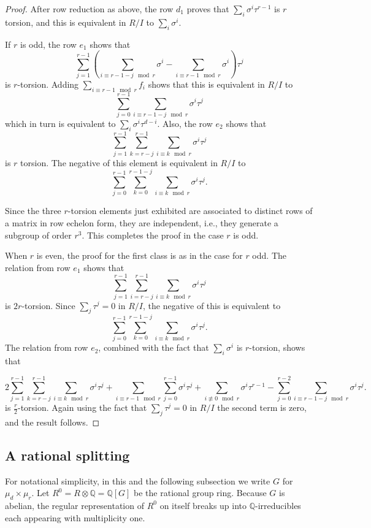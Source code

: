 \documentclass[reqno]{amsart}
\theoremstyle{definition}
\theoremstyle{remark}
\def\Q{\mathbb{Q}}
\def\tensor{\otimes}
\begin{document}
\begin{proof}
After row reduction as above, the row $d_1$ proves that
$\sum_i\sigma^i\tau^{r-1}$ is $r$ torsion, and this is equivalent in
$R/I$ to $\sum_i\sigma^i$.

If $r$ is odd, the row $e_1$ shows that 
$$\sum_{j=1}^{r-1}\left(\sum_{i\equiv r-1-j\mod r}\sigma^i-
\sum_{i\equiv r-1\mod r}\sigma^i\right)\tau^j$$
is $r$-torsion.  Adding $\sum_{i\equiv r-1\mod r}f_i$ shows that this
is equivalent in $R/I$ to
$$\sum_{j=0}^{r-1}\sum_{i\equiv r-1-j\mod r}\sigma^i\tau^j$$
which in turn is equivalent to $\sum_i\sigma^i\tau^{d-i}$.
Also, the row $e_2$ shows that
$$\sum_{j=1}^{r-1}\sum_{k=r-j}^{r-1}\sum_{i\equiv k\mod r}\sigma^i\tau^j$$
is $r$ torsion.  The negative of this element is equivalent in $R/I$ to
$$\sum_{j=0}^{r-1}\sum_{k=0}^{r-1-j}\sum_{i\equiv k\mod r}\sigma^i\tau^j.$$

Since the three $r$-torsion elements just exhibited are associated to
distinct rows of a matrix in row echelon form, they are independent,
i.e., they generate a subgroup of order $r^3$.  This completes the
proof in the case $r$ is odd.

When $r$ is even, the proof for the first class is as in the case for $r$ odd. The relation from row $e_1$ shows that 
$$\sum _{j=1}^{r-1} \sum _{i=r-j}^{r-1} \sum _{i \equiv k\mod r} \sigma^i\tau^j$$
is $2r$-torsion.
Since $\sum _j \tau ^j = 0$ in $R/I$, the negative of this is equivalent to 
$$\sum_{j=0}^{r-1} \sum _{k=0}^{r-1-j} \sum_{i \equiv k\mod r} \sigma^i\tau^j.$$
The relation from row $e_2$, combined with the fact that $\sum _i \sigma ^i$ is $r$-torsion, shows that 

$$2 \sum _{j=1}^{r-1} \sum_{k=r-j}^{r-1} \sum _{i \equiv k \mod r} \sigma ^i \tau ^j + \sum _{i \equiv {r-1} \mod r}\sum _{j=0}^{r-1} \sigma ^i \tau ^j + \sum _{i \not \equiv 0\mod r} \sigma ^i \tau ^{r-1} - \sum _{j=0}^{r-2} \sum _{i \equiv r-1-j\mod{r}} \sigma ^i \tau ^j.$$
is $\frac{r}{2}$-torsion.   Again using the fact that $\sum _j \tau ^j = 0$ in $R/I$ the second term is zero, and the result follows. 

\end{proof}




\subsection{A rational splitting}
For notational simplicity, in this and the following subsection we
write $G$ for $\mu_d\times\mu_r$.  Let $R^0=R\tensor\Q=\Q[G]$ be the
rational group ring.  Because $G$ is abelian, the regular
representation of $R^0$ on itself breaks up into $\Q$-irreducibles
each appearing with multiplicity one.
\end{document}
